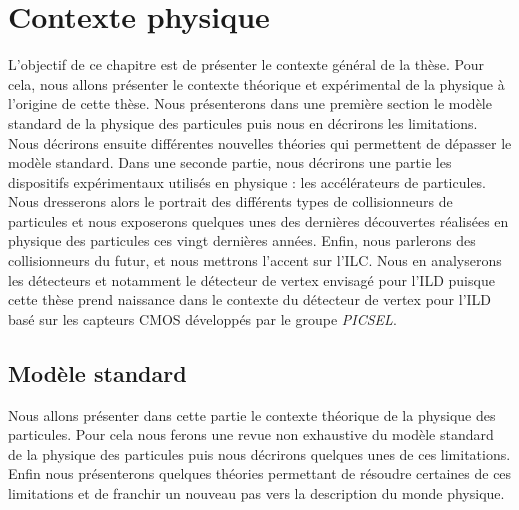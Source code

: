 \chapter{Contexte physique}

L'objectif de ce chapitre est de pr\'esenter le contexte g\'en\'eral de la th\`ese. Pour cela, nous allons pr\'esenter le contexte th\'eorique et exp\'erimental de la physique \`a l'origine de cette th\`ese. Nous présenterons dans une première section le mod\`ele standard de la physique des particules puis nous en décrirons les limitations. Nous d\'ecrirons ensuite diff\'erentes nouvelles th\'eories qui permettent de d\'epasser le mod\`ele standard. Dans une seconde partie, nous d\'ecrirons une partie les dispositifs exp\'erimentaux utilis\'es en physique : les acc\'el\'erateurs de particules. Nous dresserons alors le portrait des diff\'erents types de collisionneurs de particules et nous exposerons quelques unes des derni\`eres d\'ecouvertes r\'ealis\'ees en physique des particules ces vingt derni\`eres ann\'ees. Enfin, nous parlerons des collisionneurs du futur, et nous mettrons l'accent sur l'ILC. Nous en analyserons les d\'etecteurs et notamment le d\'etecteur de vertex envisag\'e pour l'ILD puisque cette th\`ese prend naissance dans le contexte du d\'etecteur de vertex pour l'ILD bas\'e sur les capteurs CMOS d\'evelopp\'es par le groupe \textit{PICSEL}.


\section{Mod\`ele standard}

Nous allons pr\'esenter dans cette partie le contexte th\'eorique de la physique des particules. Pour cela nous ferons une revue non exhaustive du mod\`ele standard de la physique des particules puis nous d\'ecrirons quelques unes de ces limitations. Enfin nous pr\'esenterons quelques th\'eories permettant de r\'esoudre certaines de ces limitations et de franchir un nouveau pas vers la description du monde physique.  

